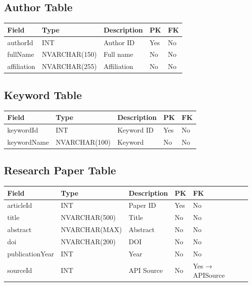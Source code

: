 \documentclass[12pt,a4paper]{article}
\begin{document}
{{%
\subsection{Author Table}
\begin{longtable}{|p{3cm}|p{3cm}|p{6cm}|p{1.5cm}|p{1.5cm}|}
	\hline
	Field & Type & Description & PK & FK \\
	\hline
	authorId & INT & Author ID & Yes & No \\
	fullName & NVARCHAR(150) & Full name & No & No \\
	affiliation & NVARCHAR(255) & Affiliation & No & No \\
	\hline
\end{longtable}

\subsection{Keyword Table}
\begin{longtable}{|p{3cm}|p{3cm}|p{6cm}|p{1.5cm}|p{1.5cm}|}
	\hline
	Field & Type & Description & PK & FK \\
	\hline
	keywordId & INT & Keyword ID & Yes & No \\
	keywordName & NVARCHAR(100) & Keyword & No & No \\
	\hline
\end{longtable}

\subsection{Research Paper Table}
\begin{longtable}{|p{3cm}|p{3cm}|p{6cm}|p{1.5cm}|p{1.5cm}|}
	\hline
	Field & Type & Description & PK & FK \\
	\hline
	articleId & INT & Paper ID & Yes & No \\
	title & NVARCHAR(500) & Title & No & No \\
	abstract & NVARCHAR(MAX) & Abstract & No & No \\
	doi & NVARCHAR(200) & DOI & No & No \\
	publicationYear & INT & Year & No & No \\
	sourceId & INT & API Source & No & Yes → APISource \\
	\hline
\end{longtable}

}}
\end{document}
